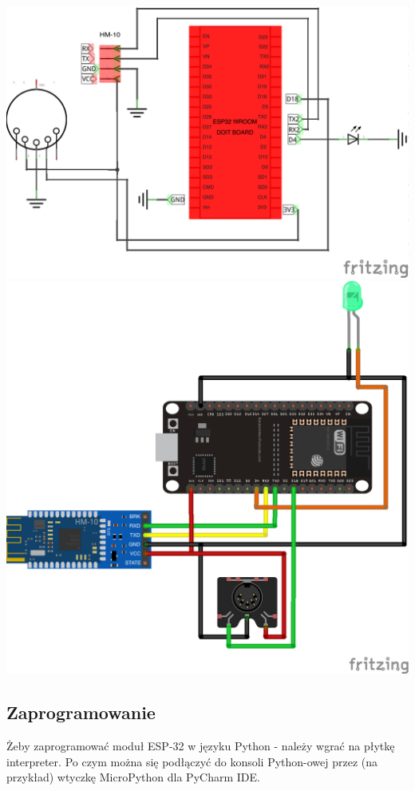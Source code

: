 \documentclass[eng,printmode]{mgr}
\begin{document}
\includegraphics[width=\textwidth]{odbiornik-schem}
\newpage
\includegraphics[width=\textwidth]{odbiornik-bb}
\newpage
\subsection{Zaprogramowanie}

Żeby zaprogramować moduł ESP-32 w języku Python - należy wgrać na płytkę interpreter. Po czym można się podłączyć do konsoli Python-owej przez (na przykład) wtyczkę MicroPython dla PyCharm IDE.
\end{document}
